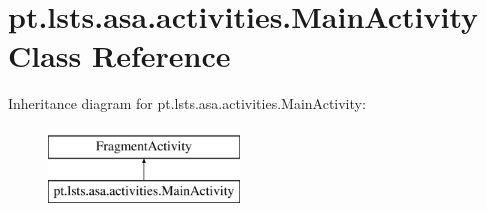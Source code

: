 \hypertarget{classpt_1_1lsts_1_1asa_1_1activities_1_1MainActivity}{}\section{pt.\+lsts.\+asa.\+activities.\+Main\+Activity Class Reference}
\label{classpt_1_1lsts_1_1asa_1_1activities_1_1MainActivity}
Inheritance diagram for pt.\+lsts.\+asa.\+activities.\+Main\+Activity\+:\begin{figure}[H]
\begin{center}
\leavevmode
\includegraphics[height=2.000000cm]{classpt_1_1lsts_1_1asa_1_1activities_1_1MainActivity}
\end{center}
\end{figure}
